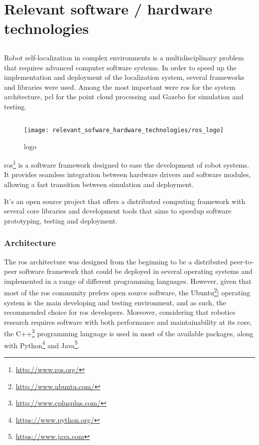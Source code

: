 \chapter{Relevant software / hardware technologies}\label{chap:relevant-sofware-hardware-technologies}



\section*{}

Robot self-localization in complex environments is a multidisciplinary problem that requires advanced computer software systems. In order to speed up the implementation and deployment of the localization system, several frameworks and libraries were used. Among the most important were \gls{ros} for the system architecture, \gls{pcl} for the point cloud processing and Gazebo for simulation and testing.



\section{}

\begin{wrapfigure}{r}{0.25\textwidth}
	\centering
	\texttt{[image: relevant\_sofware\_hardware\_technologies/ros\_logo]}
	\caption{ logo}
	\label{fig:relevant-sofware-hardware-technologies_ros-logo}
\end{wrapfigure}

\gls{ros}\footnote{\url{http://www.ros.org/}} \cite{Quigley2009} is a software framework designed to ease the development of robot systems. It provides seamless integration between hardware drivers and software modules, allowing a fast transition between simulation and deployment.

It's an open source project that offers a distributed computing framework with several core libraries and development tools that aims to speedup software prototyping, testing and deployment.


\subsection{Architecture}

The \gls{ros} architecture was designed from the beginning to be a distributed peer-to-peer software framework that could be deployed in several operating systems and implemented in a range of different programming languages. However, given that most of the \gls{ros} community prefers open source software, the Ubuntu\footnote{\url{http://www.ubuntu.com/}}] operating system is the main developing and testing environment, and as such, the recommended choice for \gls{ros} developers. Moreover, considering that robotics research requires software with both performance and maintainability at its core, the C++\footnote{\url{http://www.cplusplus.com/}} programming language is used in most of the available packages, along with Python\footnote{\url{https://www.python.org/}} and Java\footnote{\url{https://www.java.com}}.


